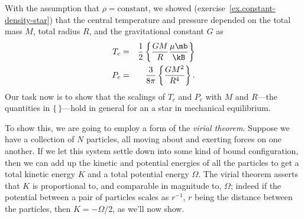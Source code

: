 With the assumption that $\rho = \textrm{constant}$, we showed (exercise~\ref{ex.constant-density-star}) that the central temperature and pressure depended on the total mass $M$, total radius $R$, and the gravitational constant $G$ as
\begin{eqnarray}
\label{e.Tc}
T_{c} &=& \frac{1}{2}\left\{\frac{GM}{R}\frac{\mu\mb}{\kB}\right\}\\
\label{e.Pc}
P_{c} &=& \frac{3}{8\pi}\left\{\frac{GM^{2}}{R^{4}}\right\}.
\end{eqnarray}
Our task now is to show that the scalings of $T_{c}$ and $P_{c}$ with $M$ and $R$---the quantities in $\{\,\}$---hold in general for an a star in mechanical equilibrium.

To show this, we are going to employ a form of the \emph{virial theorem}.  Suppose we have a collection of $N$ particles, all moving about and exerting forces on one another.  If we let this system settle down into some kind of bound configuration, then we can add up the kinetic and potential energies of all the particles to get a total kinetic energy $K$ and a total potential energy $\Omega$. The virial theorem asserts that $K$ is proportional to, and comparable in magnitude to, $\Omega$; indeed if the potential between a pair of particles scales as $r^{-1}$, $r$ being the distance between the particles, then $K = -\Omega/2$, as we'll now show.

